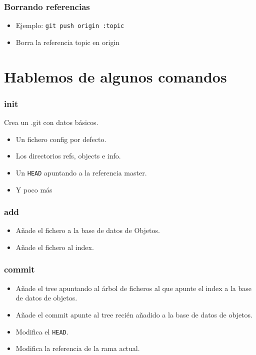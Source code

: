 \documentclass[10pt]{beamer}
\begin{document}
  \begin{frame}[containsverbatim]
    \frametitle{Borrando referencias}
    \begin{itemize}
        \item Ejemplo: \verb$git push origin :topic$
        \item Borra la referencia topic en origin
    \end{itemize}
  \end{frame}

  \section*{Hablemos de algunos comandos}

  \begin{frame}[containsverbatim]
    \frametitle{init}
    Crea un .git con datos básicos.
    \begin{itemize}
      \item Un fichero config por defecto.
      \item Los directorios refs, objects e info.
      \item Un \verb+HEAD+ apuntando a la referencia master.
      \item Y poco más
    \end{itemize}
  \end{frame}

  \begin{frame}[containsverbatim]
    \frametitle{add}
    \begin{itemize}
      \item Añade el fichero a la base de datos de Objetos.
      \item Añade el fichero al index.
    \end{itemize}
  \end{frame}

  \begin{frame}[containsverbatim]
    \frametitle{commit}
    \begin{itemize}
      \item Añade el tree apuntando al árbol de ficheros al que apunte el index a la base de datos de objetos.
      \item Añade el commit apunte al tree recién añadido a la base de datos de objetos.
      \item Modifica el \verb+HEAD+.
      \item Modifica la referencia de la rama actual.
    \end{itemize}
  \end{frame}
\end{document}
